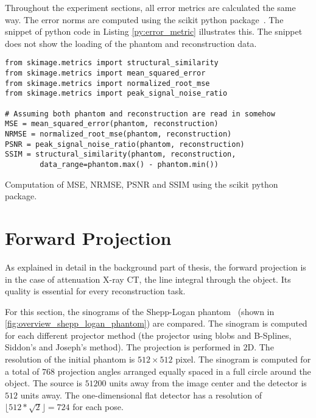 Throughout the experiment sections, all error metrics are calculated the same way. The error norms
are computed using the scikit python package~\cite{van_der_walt_scikit-image_2014}. The snippet of
python code in Listing \autoref{py:error_metric} illustrates this. The snippet does not show the
loading of the phantom and reconstruction data.

\begin{listing}[h]
	\begin{verbatim}
from skimage.metrics import structural_similarity
from skimage.metrics import mean_squared_error
from skimage.metrics import normalized_root_mse
from skimage.metrics import peak_signal_noise_ratio

# Assuming both phantom and reconstruction are read in somehow
MSE = mean_squared_error(phantom, reconstruction)
NRMSE = normalized_root_mse(phantom, reconstruction)
PSNR = peak_signal_noise_ratio(phantom, reconstruction)
SSIM = structural_similarity(phantom, reconstruction,
        data_range=phantom.max() - phantom.min())
    \end{verbatim}
	\caption{Computation of \gls{MSE}, \gls{NRMSE}, \gls{PSNR} and \gls{SSIM} using the scikit
		python package.}\label{py:error_metric}
\end{listing}

\section{Forward Projection}\label{sec:experiments_forward_projection}

As explained in detail in the background part of thesis, the forward projection is in the case of
attenuation X-ray CT, the line integral through the object. Its quality is essential for every
reconstruction task.

For this section, the sinograms of the Shepp-Logan phantom~\cite{shepp_fourier_1974} (shown in
\autoref{fig:overview_shepp_logan_phantom}) are compared. The sinogram is computed for each
different projector method (the projector using blobs and B-Splines, Siddon's and Joseph's method).
The projection is performed in \(2\)D. The resolution of the initial phantom is \(512 \times 512\)
pixel. The sinogram is computed for a total of \(768\) projection angles arranged equally spaced in
a full circle around the object. The source is \(51200\) units away from the image center and the
detector is \(512\) units away. The one-dimensional flat detector has a resolution of \(\lfloor 512
* \sqrt{2} \rfloor = 724\) for each pose.

